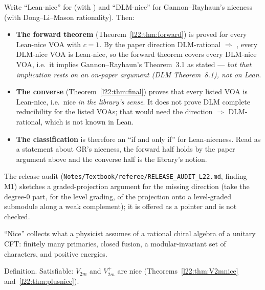 \begin{remark}\label{l22:rem:rational}
Write ``Lean-nice'' for  (with ) and ``DLM-nice'' for Gannon--Rayhaun's niceness (with
Dong--Li--Mason rationality). Then:
\begin{itemize}
\item \textbf{The forward theorem} (Theorem~\ref{l22:thm:forward}) is proved for every Lean-nice VOA with $c=1$. By the
  paper direction DLM-rational $\Rightarrow$ , every DLM-nice VOA is Lean-nice, so the forward
  theorem covers every DLM-nice VOA, i.e.\ it implies Gannon--Rayhaun's Theorem~3.1 as stated --- \emph{but that implication
  rests on an on-paper argument (DLM Theorem~8.1), not on Lean}.
\item \textbf{The converse} (Theorem~\ref{l22:thm:final}) proves that every listed VOA is Lean-nice, i.e.\ nice \emph{in the
  library's sense}. It does not prove DLM complete reducibility for the listed VOAs; that would need the direction
   $\Rightarrow$ DLM-rational, which is not known in Lean.
\item \textbf{The classification} is therefore an ``if and only if'' for Lean-niceness. Read as a statement about GR's
  niceness, the forward half holds by the paper argument above and the converse half is the library's notion.
\end{itemize}
The release audit (\texttt{Notes/\allowbreak Textbook/\allowbreak referee/\allowbreak RELEASE\_AUDIT\_L22.md}, finding M1)
sketches a graded-projection argument for the missing direction (take the degree-$0$ part, for the level grading, of the
projection onto a level-graded submodule along a weak complement); it is offered as a pointer and is not checked.
\end{remark}

\begin{physics}
``Nice'' collects what a physicist assumes of a rational chiral algebra of a unitary CFT: finitely many
primaries, closed fusion, a modular-invariant set of characters, and positive energies.
\end{physics}

\begin{status}
Definition. Satisfiable: $V_{2m}$ and $V_{2m}^+$ are nice (Theorems~\ref{l22:thm:V2mnice}
and~\ref{l22:thm:plusnice}).
\end{status}

